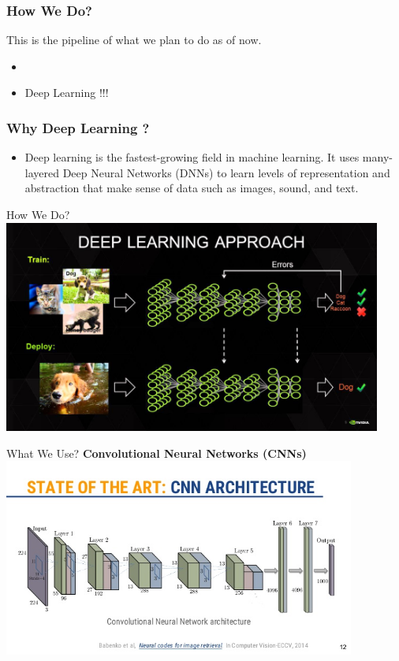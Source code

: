 \documentclass{beamer}
\begin{document}
\begin{frame}
\frametitle{How We Do?}
This is the pipeline of what we plan to do as of now. 
 
\begin{itemize}
 \item{}
 \item<2-> Deep Learning !!!
\end{itemize}
 
\end{frame}

\begin{frame}
\frametitle{Why Deep Learning ?}
\begin{itemize}
 \item<1->Deep learning is the fastest-growing field in machine learning. It uses many-layered Deep Neural Networks (DNNs) to learn levels of 
representation and abstraction that make sense of data such as images, sound, and text.
\end{itemize}
 
\end{frame}

 \begin{frame}{How We Do?}
     \includegraphics[height=7cm,width=\textwidth]{deep.jpg}
\end{frame}
 \begin{frame}{What We Use?}
 \textbf{Convolutional Neural Networks (CNNs)}
     \includegraphics[height=6.5cm,width=\textwidth]{cnn.jpg}
\end{frame}
\end{document}
